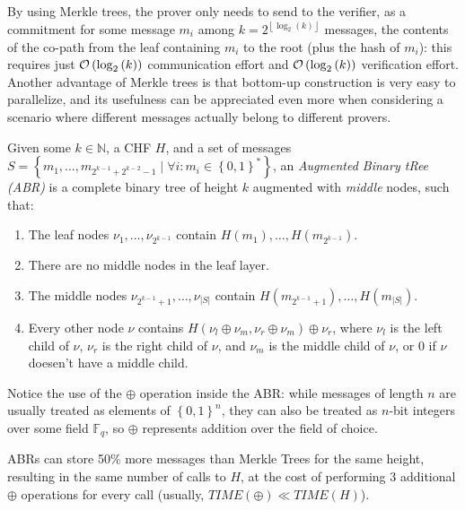 \noindent By using Merkle trees, the prover only needs to send to the verifier, as a commitment for
some message \(m_i\) among \(k = 2^{\left\lfloor\log_2(k)\right\rfloor}\) messages, the contents of
the co-path from the leaf containing \(m_i\) to the root (plus the hash of \(m_i\)): this requires
just \(\mathcal{O}\left(\log_2\left(k\right)\right)\) communication effort and
\(\mathcal{O}\left(\log_2\left(k\right)\right)\) verification effort.
Another advantage of Merkle trees is that bottom-up construction is very easy to parallelize,
and its usefulness can be appreciated even more when considering a scenario where different
messages actually belong to different provers.
\begin{definition}
	Given some \(k \in \mathbb{N}\), a CHF \(H\), and a set of messages
	\(S = \left\{m_1, \dots, m_{2^{k-1} + 2^{k-2}-1} \mid \forall i\colon m_i \in
	{\left\{0, 1\right\}}^*\right\} \),
	an \emph{Augmented Binary tRee (ABR)} is a complete binary tree of
	height \(k\) augmented with \emph{middle} nodes, such that:
	\begin{enumerate}
		\item The leaf nodes \(\nu_{1}, \dots, \nu_{2^{k-1}}\) contain \(H\left(m_1\right), \dots,
		      H\left(m_{2^{k-1}}\right)\).
		\item There are no middle nodes in the leaf layer.
		\item The middle nodes \(\nu_{2^{k-1}+1}, \dots, \nu_{\left|S\right|}\) contain
		      \(H\left(m_{2^{k-1}+1}\right), \dots, H\left(m_{\left|S\right|}\right)\).
		\item Every other node \(\nu \) contains \(H\left(\nu_l \oplus \nu_m, \nu_r \oplus
		      \nu_m\right) \oplus \nu_r \), where \(\nu_l\) is the left child of \(\nu \), \(\nu_r\)
		      is the right child of \(\nu \), and \(\nu_m\) is the middle child of \(\nu \), or \(0\)
		      if \(\nu \) doesen't have a middle child.
	\end{enumerate}
\end{definition}

\noindent Notice the use of the \(\oplus \) operation inside the ABR\@: while messages of length 
\(n\) are usually treated as elements of \({\left\{0, 1\right\}}^n\), they can also be treated as 
\(n\)-bit integers over some field \(\mathbb{F}_q\), so \(\oplus \) represents addition over the 
field of choice.

ABRs can store 50\% more messages than Merkle Trees for the same height, resulting in the same 
number of calls to \(H\), at the cost of performing 3 additional \(\oplus \) operations for
every call (usually, \(TIME\left(\oplus\right) \ll TIME\left(H\right)\)).
